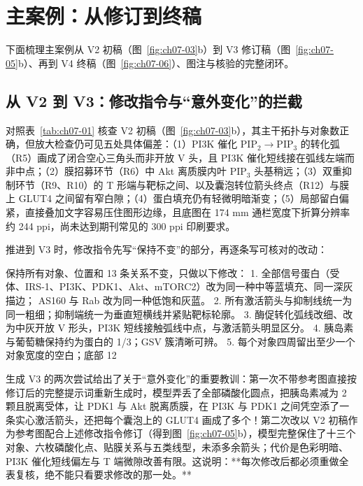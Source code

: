 \section{主案例：从修订到终稿}

下面梳理主案例从 V2 初稿（图~\ref{fig:ch07-03}b）到 V3 修订稿（图~\ref{fig:ch07-05}b）、再到 V4 终稿（图~\ref{fig:ch07-06}）、图注与核验的完整闭环。

\subsection{从 V2 到 V3：修改指令与“意外变化”的拦截}

对照表~\ref{tab:ch07-01} 核查 V2 初稿（图~\ref{fig:ch07-03}b），其主干拓扑与对象数正确，但放大检查仍可见五处具体偏差：（1）PI3K 催化 $\text{PIP}_2 \rightarrow \text{PIP}_3$ 的转化弧（R5）画成了闭合空心三角头而非开放 V 头，且 PI3K 催化短线接在弧线左端而非中点；（2）膜招募环节（R6）中 Akt 离质膜内叶 $\text{PIP}_3$ 头基稍远；（3）双重抑制环节（R9、R10）的 T 形端与靶标之间、以及囊泡转位箭头终点（R12）与膜上 GLUT4 之间留有窄白隙；（4）蛋白填充仍有轻微明暗渐变；（5）局部留白偏紧，直接叠加文字容易压住图形边缘，且底图在 174 mm 通栏宽度下折算分辨率约 244 ppi，尚未达到期刊常见的 300 ppi 印刷要求。

推进到 V3 时，修改指令先写“保持不变”的部分，再逐条写可核对的改动：

\begin{Prompt}
保持所有对象、位置和 13 条关系不变，只做以下修改：
1. 全部信号蛋白（受体、IRS-1、PI3K、PDK1、Akt、mTORC2）改为同一种中等蓝填充、同一深灰描边；
   AS160 与 Rab 改为同一种低饱和灰蓝。
2. 所有激活箭头与抑制线统一为同一粗细；抑制端统一为垂直短横线并紧贴靶标轮廓。
3. 酶促转化弧线改细、改为中灰开放 V 形头，PI3K 短线接触弧线中点，与激活箭头明显区分。
4. 胰岛素与葡萄糖保持约为蛋白的 1/3；GSV 簇清晰可辨。
5. 每个对象四周留出至少一个对象宽度的空白；底部 12%
\end{Prompt}

生成 V3 的两次尝试给出了关于“意外变化”的重要教训：第一次不带参考图直接按修订后的完整提示词重新生成时，模型弄丢了全部磷酸化圆点，把胰岛素减为 2 颗且脱离受体，让 PDK1 与 Akt 脱离质膜，在 PI3K 与 PDK1 之间凭空添了一条实心激活箭头，还把每个囊泡上的 GLUT4 画成了多个！第二次改以 V2 初稿作为参考图配合上述修改指令修订（得到图~\ref{fig:ch07-05}b），模型完整保住了十三个对象、六枚磷酸化点、贴膜关系与五类线型，未添多余箭头；代价是色彩明暗、PI3K 催化短线偏左与 T 端微隙改善有限。这说明：**每次修改后都必须重做全表复核，绝不能只看要求修改的那一处。**

